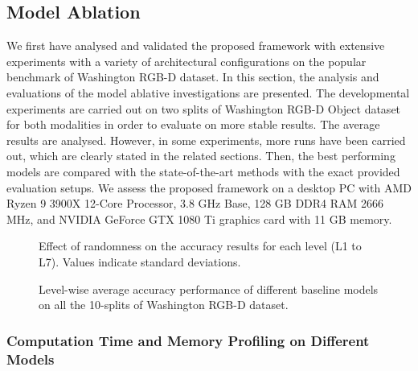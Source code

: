 \documentclass[10pt,journal,compsoc]{IEEEtran}
\begin{document}
\subsection{Model Ablation} \label{sec:exp.modelAblation}
We first have analysed and validated the proposed framework with extensive experiments with a variety of architectural configurations on the popular benchmark of Washington RGB-D dataset. In this section, the analysis and evaluations of the model ablative investigations are presented. The developmental experiments are carried out on two splits of Washington RGB-D Object dataset for both modalities in order to evaluate on more stable results. The average results are analysed. However, in some experiments, more runs have been carried out, which are clearly stated in the related sections. Then, the best performing models are compared with the state-of-the-art methods with the exact provided evaluation setups. We assess the proposed framework on a desktop PC with AMD Ryzen 9 3900X 12-Core Processor, 3.8 GHz Base, 128 GB DDR4 RAM 2666 MHz, and NVIDIA GeForce GTX 1080 Ti graphics card with 11 GB memory.

\begin{figure*}[!ht]
	\centering
	 \caption{Effect of randomness on the accuracy results for each level (L1 to L7). Values indicate standard deviations.}
	\label{fig:randomness}
\end{figure*}

\begin{figure*}[!b]
	\centering
	 \caption{Level-wise average accuracy performance of different baseline models on all the 10-splits of Washington RGB-D dataset.}
	\label{fig:levelwisePerformances}
\end{figure*}
\subsubsection{Computation Time and Memory Profiling on Different Models} \label{sec.exp.ma.profiling}
\end{document}
